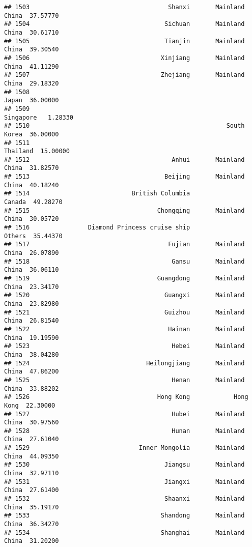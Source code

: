 \documentclass[
]{article}
\begin{document}
\begin{verbatim}
## 1503                                      Shanxi       Mainland China  37.57770
## 1504                                     Sichuan       Mainland China  30.61710
## 1505                                     Tianjin       Mainland China  39.30540
## 1506                                    Xinjiang       Mainland China  41.11290
## 1507                                    Zhejiang       Mainland China  29.18320
## 1508                                                            Japan  36.00000
## 1509                                                        Singapore   1.28330
## 1510                                                      South Korea  36.00000
## 1511                                                         Thailand  15.00000
## 1512                                       Anhui       Mainland China  31.82570
## 1513                                     Beijing       Mainland China  40.18240
## 1514                            British Columbia               Canada  49.28270
## 1515                                   Chongqing       Mainland China  30.05720
## 1516                Diamond Princess cruise ship               Others  35.44370
## 1517                                      Fujian       Mainland China  26.07890
## 1518                                       Gansu       Mainland China  36.06110
## 1519                                   Guangdong       Mainland China  23.34170
## 1520                                     Guangxi       Mainland China  23.82980
## 1521                                     Guizhou       Mainland China  26.81540
## 1522                                      Hainan       Mainland China  19.19590
## 1523                                       Hebei       Mainland China  38.04280
## 1524                                Heilongjiang       Mainland China  47.86200
## 1525                                       Henan       Mainland China  33.88202
## 1526                                   Hong Kong            Hong Kong  22.30000
## 1527                                       Hubei       Mainland China  30.97560
## 1528                                       Hunan       Mainland China  27.61040
## 1529                              Inner Mongolia       Mainland China  44.09350
## 1530                                     Jiangsu       Mainland China  32.97110
## 1531                                     Jiangxi       Mainland China  27.61400
## 1532                                     Shaanxi       Mainland China  35.19170
## 1533                                    Shandong       Mainland China  36.34270
## 1534                                    Shanghai       Mainland China  31.20200

\end{verbatim}
\end{document}
